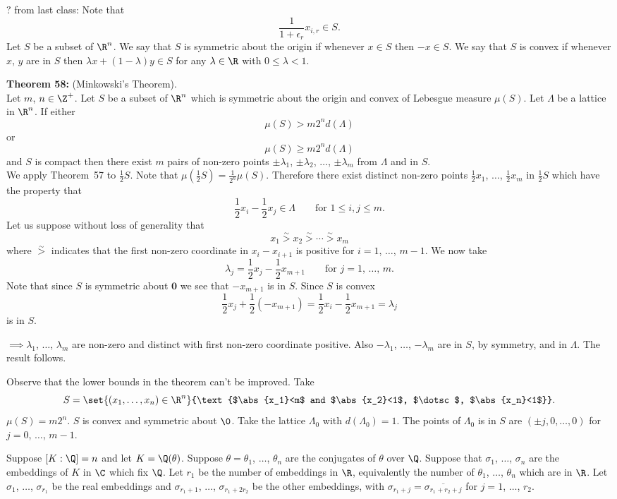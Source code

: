 $?$ from last class: Note that
\[ \frac{1}{1+\epsilon_r}x_{i,r} \in S . \]
 Let $S$ be a subset of $\R^n$.  We say that $S$ is symmetric about the origin if whenever $x\in S$ then $-x\in S$.  We say that $S$ is convex if whenever $x$, $y$ are in $S$ then $\lambda x+(1-\lambda)y\in S$ for any $\lambda\in\R$ with $0\leq\lambda<1$.

\textbf{Theorem 58:} (Minkowski's Theorem). \\
Let $m$, $n\in\Z^+$.  Let $S$ be a subset of $\R^n$ which is symmetric about the origin and convex of Lebesgue measure $\mu(S)$.  Let $\Lambda$ be a lattice in $\R^n$.  If either
\[ \mu(S) > m 2^n d(\Lambda) \]
or
\[ \mu(S) \geq m 2^n d(\Lambda) \]
and $S$ is compact then there exist $m$ pairs of non-zero points $\pm\lambda_1$, $\pm\lambda_2$, $\dotsc$, $\pm\lambda_m$ from $\Lambda$ and in $S$. \\
\pf We apply Theorem~57 to $\frac12S$.  Note that $\mu(\frac12S)=\frac{1}{2^n}\mu(S)$.  Therefore there exist distinct non-zero points $\frac12x_1$, $\dotsc$, $\frac12x_m$ in $\frac12S$ which have the property that
\[ \frac12 x_i - \frac12 x_j \in \Lambda \qquad \text{for $1\leq i,j\leq m$} . \]
Let us suppose without loss of generality that
\[ x_1 \mathrel{\overset{\sim}{>}} x_2 \mathrel{\overset{\sim}{>}} \dotsb \mathrel{\overset{\sim}{>}} x_m \]
where $\mathrel{\overset{\sim}{>}}$ indicates that the first non-zero coordinate in $x_i-x_{i+1}$ is positive for $i=1$, $\dotsc$, $m-1$.  We now take
\[ \lambda_j = \frac12 x_j - \frac12 x_{m+1} \qquad \text{for $j=1$, $\dotsc$, $m$} . \]
Note that since $S$ is symmetric about $\mathbf{0}$ we see that $-x_{m+1}$ is in $S$.  Since $S$ is convex
\[ \frac12 x_j + \frac12(-x_{m+1}) = \frac12 x_i - \frac12 x_{m+1} = \lambda_j \]
is in $S$.

$\implies \lambda_1$, $\dotsc$, $\lambda_m$ are non-zero and distinct with first non-zero coordinate positive.  Also $-\lambda_1$, $\dotsc$, $-\lambda_m$ are in $S$, by symmetry, and in $\Lambda$.  The result follows.

Observe that the lower bounds in the theorem can't be improved.  Take
\[ S = \set{(x_1,\dotsc,x_n)\in\R^n}{\text{$\abs{x_1}<m$ and $\abs{x_2}<1$, $\dotsc$, $\abs{x_n}<1$}} . \]
$\mu(S)=m2^n$.  $S$ is convex and symmetric about $\0$.  Take the lattice $\Lambda_0$ with $d(\Lambda_0)=1$.  The points of $\Lambda_0$ is in $S$ are $(\pm j,0,\dotsc,0)$ for $j=0$, $\dotsc$, $m-1$.

Suppose $[K:\Q]=n$ and let $K=\Q(\theta)$.  Suppose $\theta=\theta_1$, $\dotsc$, $\theta_n$ are the conjugates of $\theta$ over $\Q$.  Suppose that $\sigma_1$, $\dotsc$, $\sigma_n$ are the embeddings of $K$ in $\C$ which fix $\Q$.  Let $r_1$ be the number of embeddings in $\R$, equivalently the number of $\theta_1$, $\dotsc$, $\theta_n$ which are in $\R$.  Let $\sigma_1$, $\dotsc$, $\sigma_{r_1}$ be the real embeddings and $\sigma_{r_1+1}$, $\dotsc$, $\sigma_{r_1+2r_2}$ be the other embeddings, with $\sigma_{r_1+j}=\overline{\sigma_{r_1+r_2+j}}$ for $j=1$, $\dotsc$, $r_2$.

